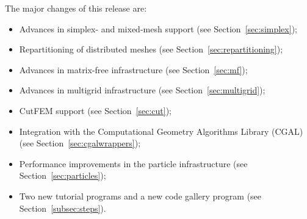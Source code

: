 \documentclass{ansarticle-preprint}
\begin{document}
The major changes of this release are:
%
\begin{itemize}
  \item Advances in simplex- and mixed-mesh support (see Section~\ref{sec:simplex});
  \item Repartitioning of distributed meshes (see Section~\ref{sec:repartitioning});
  \item Advances in matrix-free infrastructure (see Section~\ref{sec:mf});
  \item Advances in multigrid infrastructure (see Section~\ref{sec:multigrid});
  \item CutFEM support (see Section~\ref{sec:cut});
  \item Integration with the Computational Geometry Algorithms Library (CGAL) (see Section~\ref{sec:cgalwrappers});
  \item Performance improvements in the particle infrastructure (see Section~\ref{sec:particles});
  \item Two new tutorial programs and a new code gallery program (see
    Section~\ref{subsec:steps}).
\end{itemize}
%
\end{document}
